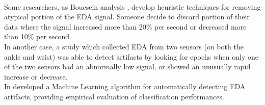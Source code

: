 \\
Some researchers, as Boucsein analysis \cite{boucsein2012electrodermal}, develop heuristic techniques for removing atypical portion of the EDA signal. Someone decide to discard portion of their data where the signal increased more than 20\% per second or decreased more than 10\% per second.
\\
In another case, a study which collected EDA from two sensors (on both the ankle and wrist) \cite{hedman2010situ} was able to detect artifacts by looking for epochs when only one of the two sensors had an abnormally low signal, or showed an unusually rapid increase or decrease.
\\ \indent
In \cite{taylor2015automatic} developed a Machine Learning algorithm for automatically detecting EDA artifacts, providing empirical evaluation of classification performances.

